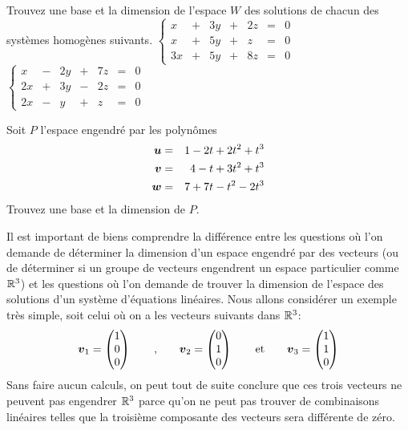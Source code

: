 \begin{exerciceC}
Trouvez une base et la dimension de l'espace $W$ des solutions de chacun des systèmes homogènes suivants.
 $\displaystyle \left\{
\begin{matrix}
x &+& 3y &+& 2z &=& 0 \\
x &+& 5y &+& z &=& 0 \\
3x &+& 5y &+& 8z &=& 0
\end{matrix}\right.
$
 $\displaystyle\left\{
\begin{matrix}
x &-& 2y &+& 7z &=& 0 \\
2x &+& 3y &-& 2z &=& 0 \\
2x &-& y &+& z &=& 0
\end{matrix}\right.
$
\end{exerciceC}
\begin{exerciceC}
Soit $P$ l'espace engendré par les polynômes
\begin{eqnarray*}
\boldsymbol{u} &=& 1 - 2t + 2t^2 + t^3 \\
\boldsymbol{v} &=& 4 - t +3t^2 + t^3 \\
\boldsymbol{w} &=& 7 + 7t -t^2 -2t^3
\end{eqnarray*}
Trouvez une base et la dimension de $P$.
\end{exerciceC}

\medskip
Il est important de biens comprendre la différence entre les questions où l'on demande 
de déterminer la dimension d'un espace engendré par des vecteurs (ou de déterminer si
un groupe de vecteurs engendrent un espace particulier comme $\mathbb{R}^3$) et les questions où
l'on demande de trouver la dimension de l'espace des solutions d'un système d'équations linéaires.
Nous allons considérer un exemple très simple, soit celui où on a les
vecteurs suivants dans  $\mathbb{R}^3$:
\[
\boldsymbol{v}_1 = \begin{pmatrix}
1 \\ 0 \\ 0
\end{pmatrix}
\qquad\mbox{,}\qquad
\boldsymbol{v}_2 = \begin{pmatrix}
0 \\ 1 \\ 0
\end{pmatrix}
\qquad\mbox{et}\qquad
\boldsymbol{v}_3 = \begin{pmatrix}
1 \\ 1 \\ 0
\end{pmatrix}
\]
Sans faire aucun calculs, on peut tout de suite conclure que ces trois vecteurs ne peuvent
pas engendrer $\mathbb{R}^3$ parce qu'on ne peut pas trouver de combinaisons linéaires telles
que la troisième composante des vecteurs sera différente de zéro.

